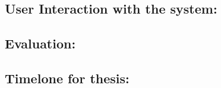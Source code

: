 \subsection{User Interaction with the system:}

\subsection{Evaluation:}

\subsection{Timelone for thesis:}

